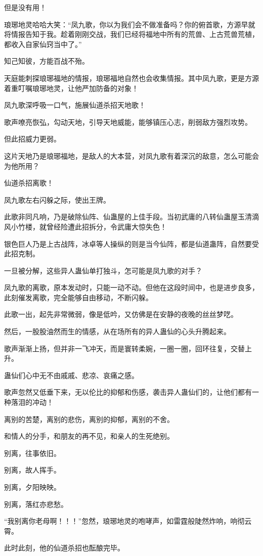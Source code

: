 \begin{this_body}
但是没有用！

琅琊地灵哈哈大笑：“凤九歌，你以为我们会不做准备吗？你的俯首歌，方源早就将情报告知于我。趁着刚刚交战，我们已经将福地中所有的荒兽、上古荒兽荒植，都收入自家仙窍当中了。”

知己知彼，方能百战不殆。

天庭能刺探琅琊福地的情报，琅琊福地自然也会收集情报。其中凤九歌，更是方源着重叮嘱琅琊地灵，让他严加防备的对象！

凤九歌深呼吸一口气，施展仙道杀招天地歌！

歌声嘹亮恢弘，勾动天地，引导天地威能，能够镇压心志，削弱敌方强烈攻势。

但此招威力更弱。

这片天地乃是琅琊福地，是敌人的大本营，对凤九歌有着深沉的敌意，怎么可能会为他所用？

仙道杀招离歌！

凤九歌左右闪躲之际，使出王牌。

此歌非同凡响，乃是破除仙阵、仙蛊屋的上佳手段。当初武庸的八转仙蛊屋玉清滴风小竹楼，就曾经险遭此招拆分，令武庸大惊失色！

银色巨人乃是上古战阵，冰卓等人操纵的则是当今仙阵，都是仙道蛊阵，自然要受此招克制。

一旦被分解，这些异人蛊仙单打独斗，怎可能是凤九歌的对手？

凤九歌的离歌，原本发动时，只能一动不动。但他在这段时间中，也是进步良多，此刻催发离歌，完全能够自由移动，不断闪躲。

此歌一出，起先非常微弱，像是低吟，又仿佛是在安静的夜晚的丝丝梦呓。

然后，一股股油然而生的情感，从在场所有的异人蛊仙的心头升腾起来。

歌声渐渐上扬，但并非一飞冲天，而是寰转柔婉，一圈一圈，回环往复，交替上升。

蛊仙们心中无不由戚戚、悲凉、哀痛之感。

歌声忽然又低垂下来，无以伦比的抑郁和伤感，袭击异人蛊仙们的，让他们都有一种落泪的冲动！

离别的苦楚，离别的悲伤，离别的抑郁，离别的不舍。

和情人的分手，和朋友的再不见，和亲人的生死绝别。

别离，往事依旧。

别离，故人挥手。

别离，夕阳映映。

别离，落红亦悲愁。

“我别离你老母啊！！！”忽然，琅琊地灵的咆哮声，如雷霆般陡然炸响，响彻云霄。

此时此刻，他的仙道杀招也酝酿完毕。


\end{this_body}

